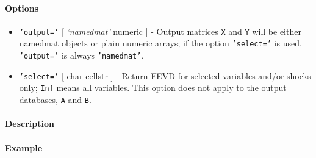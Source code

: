  \paragraph{Options}
 
 \begin{itemize}
 \item
   \texttt{'output='} {[} \emph{`namedmat'} \textbar{} numeric {]} -
   Output matrices \texttt{X} and \texttt{Y} will be either namedmat
   objects or plain numeric arrays; if the option \texttt{'select='} is
   used, \texttt{'output='} is always \texttt{'namedmat'}.
 \item
   \texttt{'select='} {[} char \textbar{} cellstr {]} - Return FEVD for
   selected variables and/or shocks only; \texttt{Inf} means all
   variables. This option does not apply to the output databases,
   \texttt{A} and \texttt{B}.
 \end{itemize}
 
 \paragraph{Description}
 
 \paragraph{Example}



